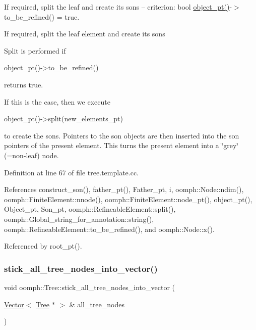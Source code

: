 If required, split the leaf and create its sons -- criterion\+: bool \hyperlink{classoomph_1_1Tree_a2f2eeb0f1dd161f696cccc652974ff4c}{object\+\_\+pt()}-\/$>$ to\+\_\+be\+\_\+refined() = true. 

If required, split the leaf element and create its sons

Split is performed if \begin{DoxyVerb} object_pt()->to_be_refined()
\end{DoxyVerb}


returns true.

If this is the case, then we execute \begin{DoxyVerb} object_pt()->split(new_elements_pt) 
\end{DoxyVerb}


to create the sons. Pointers to the son objects are then inserted into the son pointers of the present element. This turns the present element into a \char`\"{}grey\char`\"{} (=non-\/leaf) node. 

Definition at line 67 of file tree.\+template.\+cc.



References construct\+\_\+son(), father\+\_\+pt(), Father\+\_\+pt, i, oomph\+::\+Node\+::ndim(), oomph\+::\+Finite\+Element\+::nnode(), oomph\+::\+Finite\+Element\+::node\+\_\+pt(), object\+\_\+pt(), Object\+\_\+pt, Son\+\_\+pt, oomph\+::\+Refineable\+Element\+::split(), oomph\+::\+Global\+\_\+string\+\_\+for\+\_\+annotation\+::string(), oomph\+::\+Refineable\+Element\+::to\+\_\+be\+\_\+refined(), and oomph\+::\+Node\+::x().



Referenced by root\+\_\+pt().

\mbox{\label{classoomph_1_1Tree_a2c84b4e4700a825ef0a6ca533b9ae895}} 
\subsubsection{\texorpdfstring{stick\+\_\+all\+\_\+tree\+\_\+nodes\+\_\+into\+\_\+vector()}{stick\_all\_tree\_nodes\_into\_vector()}}
{\footnotesize\ttfamily void oomph\+::\+Tree\+::stick\+\_\+all\+\_\+tree\+\_\+nodes\+\_\+into\+\_\+vector (\begin{DoxyParamCaption}\item[{\hyperlink{classoomph_1_1Vector}{Vector}$<$ \hyperlink{classoomph_1_1Tree}{Tree} $\ast$ $>$ \&}]{all\+\_\+tree\+\_\+nodes }\end{DoxyParamCaption})}



